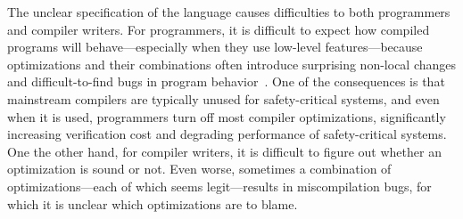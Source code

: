 The unclear specification of the language causes difficulties to both programmers and compiler
writers.  For programmers, it is difficult to expect how compiled programs will behave---especially
when they use low-level features---because optimizations and their combinations often introduce
surprising non-local changes and difficult-to-find bugs in program
behavior~\cite{wang2013towards,yang2011finding}.  One of the consequences is that mainstream
compilers are typically unused for safety-critical systems, and even when it is used, programmers
turn off most compiler optimizations, significantly increasing verification cost and degrading
performance of safety-critical systems.  One the other hand, for compiler writers, it is difficult
to figure out whether an optimization is sound or not.  Even worse, sometimes a combination of
optimizations---each of which seems legit---results in miscompilation bugs, for which it is unclear
which optimizations are to blame.








